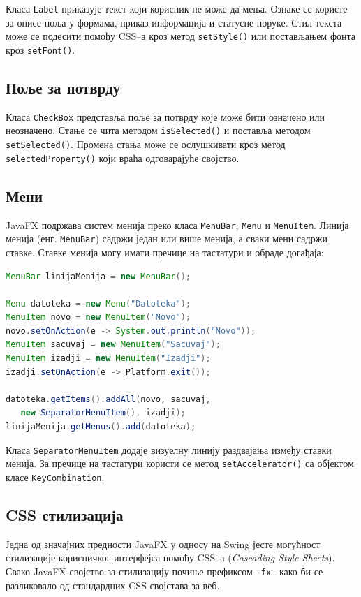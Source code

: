 Класа \texttt{Label} приказује текст који корисник не може да мења. Ознаке се користе за описе поља у формама, приказ информација и статусне поруке. Стил текста може се подесити помоћу CSS–а кроз метод \texttt{setStyle()} или постављањем фонта кроз \texttt{setFont()}.


\subsection{Поље за потврду}

Класа \texttt{CheckBox} представља поље за потврду које може бити означено или неозначено. Стање се чита методом \texttt{isSelected()} и поставља методом \texttt{setSelected()}. Промена стања може се ослушкивати кроз метод \texttt{selectedProperty()} који враћа одговарајуће својство.


\subsection{Мени}

JavaFX подржава систем менија преко класа \texttt{MenuBar}, \texttt{Menu} и \texttt{MenuItem}. Линија менија (енг. \texttt{MenuBar}) садржи један или више менија, а сваки мени садржи ставке. Ставке менија могу имати пречице на тастатури и обраде догађаја:


\begin{lstlisting}[language=Java]
MenuBar linijaMenija = new MenuBar();
 
Menu datoteka = new Menu("Datoteka");
MenuItem novo = new MenuItem("Novo");
novo.setOnAction(e -> System.out.println("Novo"));
MenuItem sacuvaj = new MenuItem("Sacuvaj");
MenuItem izadji = new MenuItem("Izadji");
izadji.setOnAction(e -> Platform.exit());
 
datoteka.getItems().addAll(novo, sacuvaj,
   new SeparatorMenuItem(), izadji);
linijaMenija.getMenus().add(datoteka);
\end{lstlisting}


Класа \texttt{SeparatorMenuItem} додаје визуелну линију раздвајања између ставки менија. За пречице на тастатури користи се метод \texttt{setAccelerator()} са објектом класе \texttt{KeyCombination}.


\subsection{CSS стилизација}

Једна од значајних предности JavaFX у односу на Swing јесте могућност стилизације корисничког интерфејса помоћу CSS–а (\textit{Cascading Style Sheets}). Свако JavaFX својство за стилизацију почиње префиксом \texttt{-fx-} како би се разликовало од стандардних CSS својстава за веб.

